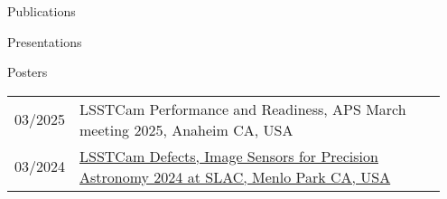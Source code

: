 \documentclass{resume} %
\begin{document}
\begin{rSection}{Publications}
\begin{rSection}{Presentations}
\begin{rSubsection}{Posters}{}{}{}
\begin{table}[h]
\begin{tabular}{p{0.07\linewidth} p{0.88\linewidth}}
03/2025 & LSSTCam Performance and Readiness, APS March meeting 2025, Anaheim CA, USA\\
03/2024 & \href{https://indico.slac.stanford.edu/event/8442/contributions/8626/}{LSSTCam Defects, Image Sensors for Precision Astronomy 2024 at SLAC, Menlo Park CA, USA}\\
\end{tabular}
\end{table}
\end{rSubsection}

\end{rSection}


    
%            
%            
%
%            
%            
%
%            
%            
%    
        


    
\end{rSection}
\end{document}
